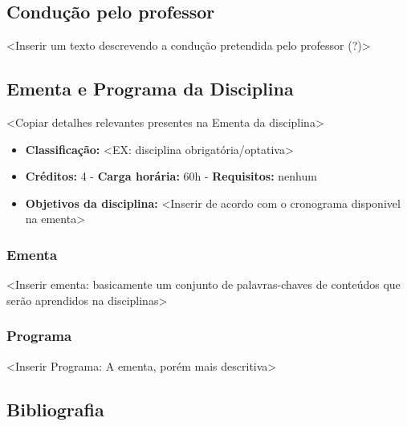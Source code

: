 \documentclass[12pt, a4paper]{article}
\begin{document}
\subsection{Condução pelo professor} \label{subsec:conducao}


<Inserir um texto descrevendo a condução pretendida pelo professor (?)>

\subsection{Ementa e Programa da Disciplina} \label{subsec:ementa_e_programa}

<Copiar detalhes relevantes presentes na Ementa da disciplina>

\begin{itemize}
    \item \textbf{Classificação:} <EX: disciplina obrigatória/optativa>
    \item \textbf{Créditos:} 4 - \textbf{Carga horária:} 60h - \textbf{Requisitos:} nenhum
    \item \textbf{Objetivos da disciplina:} <Inserir de acordo com o cronograma disponivel na ementa>
\end{itemize}

\subsubsection{Ementa} \label{subsubsec:ementa}

<Inserir ementa: basicamente um conjunto de palavras-chaves de conteúdos que serão aprendidos na disciplinas>

\subsubsection{Programa} \label{subsubsec:programa}

<Inserir Programa: A ementa, porém mais descritiva>

\subsection{Bibliografia} \label{subsec:bibliografia}

\end{document}
